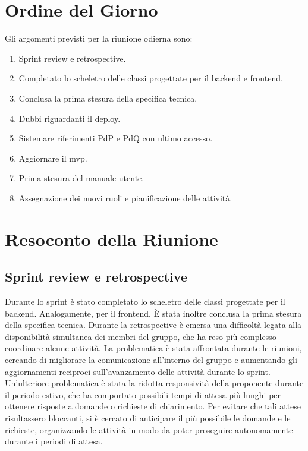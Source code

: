 \section{Ordine del Giorno}
Gli argomenti previsti per la riunione odierna sono:
\begin{enumerate}
	\item Sprint review e retrospective.
	\item Completato lo scheletro delle classi progettate per il backend e frontend.
	\item Conclusa la prima stesura della specifica tecnica.
	\item Dubbi riguardanti il deploy.
	\item Sistemare riferimenti PdP e PdQ con ultimo accesso.
	\item Aggiornare il mvp.
	\item Prima stesura del manuale utente.
	\item Assegnazione dei nuovi ruoli e pianificazione delle attività.
\end{enumerate}

\section{Resoconto della Riunione}

\subsection{Sprint review e retrospective}
Durante lo sprint è stato completato lo scheletro delle classi progettate per il backend. 
Analogamente, per il frontend. 
È stata inoltre conclusa la prima stesura della specifica tecnica.
Durante la retrospective è emersa una difficoltà legata alla disponibilità simultanea dei membri del gruppo, 
che ha reso più complesso coordinare alcune attività. La problematica è stata affrontata durante le riunioni, 
cercando di migliorare la comunicazione all'interno del gruppo e aumentando gli aggiornamenti reciproci sull'avanzamento delle attività durante lo sprint.
Un'ulteriore problematica è stata la ridotta responsività della proponente durante il periodo estivo, 
che ha comportato possibili tempi di attesa più lunghi per ottenere risposte a domande o richieste di chiarimento. 
Per evitare che tali attese risultassero bloccanti, 
si è cercato di anticipare il più possibile le domande e le richieste, 
organizzando le attività in modo da poter proseguire autonomamente durante i periodi di attesa.


